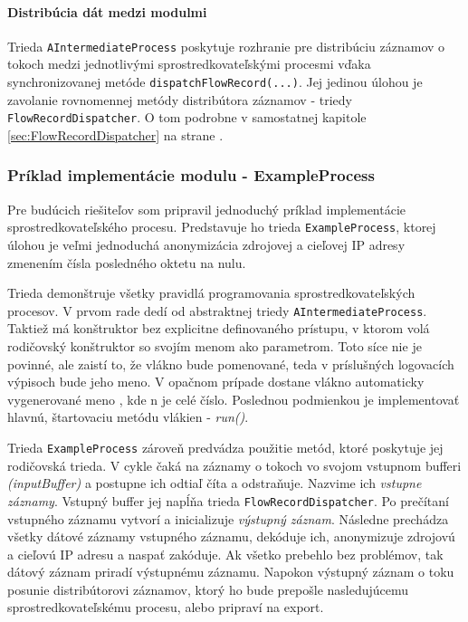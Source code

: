 \paragraph{Distribúcia dát medzi modulmi} 
Trieda \verb|AIntermediateProcess| poskytuje rozhranie pre distribúciu záznamov o tokoch medzi 
jednotlivými sprostredkovateľskými procesmi vďaka synchronizovanej metóde \verb|dispatchFlowRecord(...)|. 
Jej jedinou úlohou je zavolanie rovnomennej metódy distribútora záznamov - triedy \verb|FlowRecordDispatcher|.
O tom podrobne v samostatnej kapitole \ref{sec:FlowRecordDispatcher} na strane 
\pageref{sec:FlowRecordDispatcher}.



\subsubsection{Príklad implementácie modulu - ExampleProcess}

Pre budúcich riešiteľov som pripravil jednoduchý príklad implementácie sprostredkovateľského procesu.
Predstavuje ho trieda \verb|ExampleProcess|, ktorej úlohou je veľmi jednoduchá anonymizácia zdrojovej a 
cieľovej IP adresy zmenením čísla posledného oktetu na nulu. 

Trieda demonštruje všetky pravidlá programovania sprostredkovateľských procesov. V prvom rade dedí od 
abstraktnej triedy \verb|AIntermediateProcess|. Taktiež má konštruktor bez explicitne definovaného 
prístupu, v ktorom volá rodičovský konštruktor so svojím menom ako parametrom. Toto síce nie je povinné,
ale zaistí to, že vlákno bude pomenované, teda v príslušných logovacích výpisoch bude jeho meno.
V opačnom prípade dostane vlákno automaticky vygenerované meno , kde n je celé číslo.
Poslednou podmienkou je implementovať hlavnú, štartovaciu metódu vlákien - \emph{run()}.

Trieda \verb|ExampleProcess| zároveň predvádza použitie metód, ktoré poskytuje jej rodičovská trieda.
V cykle čaká na záznamy o tokoch vo svojom vstupnom bufferi \emph{(inputBuffer)} a postupne ich odtiaľ 
číta a odstraňuje. Nazvime ich 
\emph{vstupne záznamy}. Vstupný buffer jej napĺňa trieda \verb|FlowRecordDispatcher|. Po prečítaní 
vstupného záznamu vytvorí a inicializuje \emph{výstupný záznam}. Následne prechádza všetky dátové záznamy
vstupného záznamu, dekóduje ich, anonymizuje zdrojovú a cieľovú IP adresu a naspať zakóduje. Ak všetko 
prebehlo bez problémov, tak dátový záznam priradí výstupnému záznamu. Napokon výstupný záznam o toku 
posunie distribútorovi záznamov, ktorý ho bude prepošle 
nasledujúcemu sprostredkovateľskému procesu, alebo pripraví na export.

